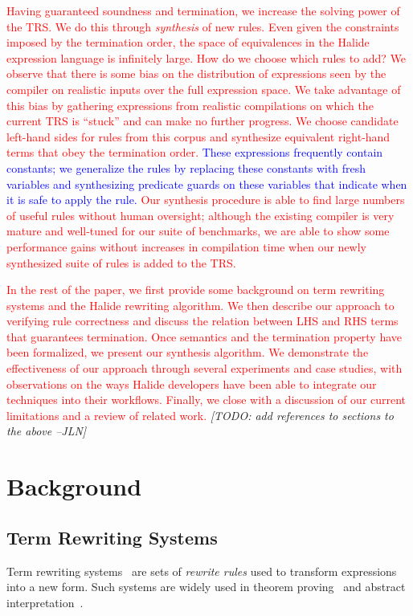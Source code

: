 \documentclass[acmsmall,review]{acmart}\settopmatter{printfolios=true,printccs=false,printacmref=false}
\newcommand{\jln}[1]{\textcolor{uwpurple}{\textit{[{#1} --JLN]}}}
\newcommand{\modified}[1]{\textcolor{red}{{#1}}}
\newcommand{\modifiedagain}[1]{\textcolor{blue}{{#1}}}
\begin{document}
\modified{Having guaranteed soundness and termination, we increase 
the solving power of the TRS. We do this through \emph{synthesis} of new rules. Even
given the constraints imposed by the termination order, the space of equivalences 
in the Halide expression language is infinitely large. How do we choose which  
rules to add? We observe that there is some bias on the distribution of expressions 
seen by the compiler on realistic inputs over the full expression space. We take advantage 
of this bias by gathering expressions from realistic compilations on which the current 
TRS is ``stuck'' and can make no further progress. We choose candidate left-hand sides 
for rules from this corpus and synthesize equivalent right-hand terms that obey the 
termination order. \modifiedagain{These expressions frequently contain constants; we generalize the rules by replacing these constants  
with fresh variables and synthesizing predicate guards on these variables that indicate when it is safe to apply 
the rule.} Our synthesis procedure is able to find large numbers of useful rules without
human oversight; although the existing compiler is very mature 
and well-tuned for our suite of benchmarks, we are able to show some performance 
gains without increases in compilation time when our newly synthesized suite 
of rules is added to the TRS. }


\modified{In the rest of the paper, we first provide some background on term rewriting systems 
and the Halide rewriting algorithm. We then describe our approach to verifying 
rule correctness and discuss the relation between LHS and RHS terms that guarantees 
termination. Once semantics and the termination property have been formalized, 
we present our synthesis algorithm. We demonstrate the effectiveness of our approach 
through several experiments and case studies, with observations on the ways Halide developers 
have been able to integrate our techniques into their workflows. Finally, we close
 with a discussion of our current limitations and a review of related work.}
\jln{TODO: add references to sections to the above}


\section{Background}
\subsection{Term Rewriting Systems}
Term rewriting systems~\cite{gorn1967} are sets of \textit{rewrite rules} used to transform expressions into a new form.  Such systems are widely
used in theorem proving~\cite{baader1999term} and abstract interpretation~\cite{cousot1977abstract, cousot1979systematic}.
\end{document}
